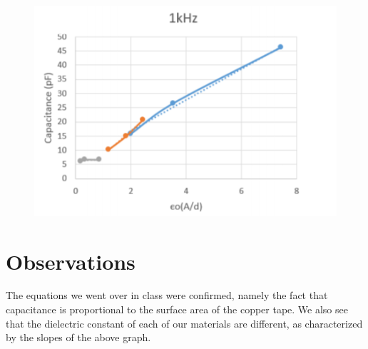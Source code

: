 \documentclass{article}
\begin{document}
\begin{figure}[h!]
\centering
\includegraphics[scale=0.7]{cap.png}
\end{figure}

\section{Observations}

The equations we went over in class were confirmed, namely the fact that capacitance is proportional to the surface area of the copper tape. We also see that the dielectric constant of each of our materials are different, as characterized by the slopes of the above graph.
\end{document}
